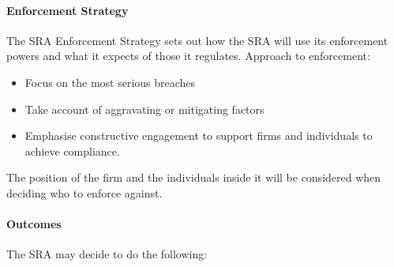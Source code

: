 \documentclass[
]{article}
\providecommand{\tightlist}{%
  \setlength{\itemsep}{0pt}\setlength{\parskip}{0pt}}
\begin{document}
\hypertarget{enforcement-strategy}{%
\paragraph{Enforcement Strategy}\label{enforcement-strategy}}

The SRA Enforcement Strategy sets out how the SRA will use its
enforcement powers and what it expects of those it regulates. Approach
to enforcement:

\begin{itemize}
\tightlist
\item
  Focus on the most serious breaches
\item
  Take account of aggravating or mitigating factors
\item
  Emphasise constructive engagement to support firms and individuals to
  achieve compliance.
\end{itemize}

The position of the firm and the individuals inside it will be
considered when deciding who to enforce against.

\hypertarget{outcomes}{%
\paragraph{Outcomes}\label{outcomes}}

The SRA may decide to do the following:
\end{document}
